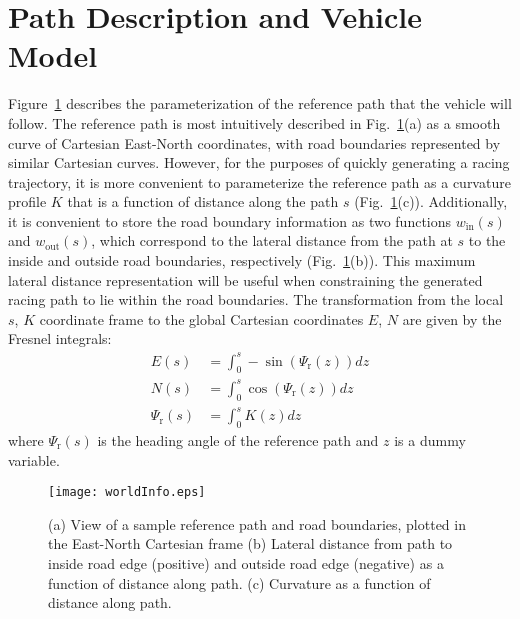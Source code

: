\documentclass[twocolumn,10pt]{asme2ej}
\begin{document}
\section{Path Description and Vehicle Model}
\label{sec:PATH}
Figure~\ref{fig:worldInfo} describes the parameterization of the reference path that the vehicle will follow. The reference path is most intuitively described in Fig.~\ref{fig:worldInfo}(a) as a 
smooth curve of Cartesian East-North coordinates, with road boundaries represented by similar Cartesian curves. However, for the purposes of quickly generating
a racing trajectory, it is more convenient to parameterize the reference path as a curvature profile $K$ that is a function of distance along the path $s$ (Fig.~\ref{fig:worldInfo}(c)). Additionally, it is 
convenient to store the road boundary information as two functions $w_\mathrm{in}(s)$ and $w_\mathrm{out}(s)$, which correspond to the lateral distance from the path at $s$
 to the inside and outside road boundaries, respectively (Fig.~\ref{fig:worldInfo}(b)). This maximum lateral distance representation will be useful when constraining the generated racing path to lie within the road 
 boundaries. The transformation from the local $s$, $K$ coordinate frame to 
the global Cartesian coordinates $E$, $N$ are given by the Fresnel integrals:
\begin{subequations}
\label{eq:fresnel}
\begin{align}
	E(s) &= \int_0^s  -\sin(\Psi_\mathrm{r}(z)) dz \\
	N(s) &= \int_0^s   \cos(\Psi_\mathrm{r}(z)) dz \\
	\Psi_\mathrm{r}(s) &= \int_0^s K(z) dz \label{eq:balls}
\end{align}
\end{subequations}
where $\Psi_\mathrm{r}(s)$ is the heading angle of the reference path and $z$ is a dummy variable. 

 \begin{figure}
\centering
\texttt{[image: worldInfo.eps]}
\caption{(a) View of a sample reference path and road boundaries, plotted in the East-North Cartesian frame (b) Lateral distance from path to inside road edge (positive) and outside road edge (negative) as a function
of distance along path. (c) Curvature as a function of distance along path.}
\label{fig:worldInfo}
\end{figure}
\end{document}

